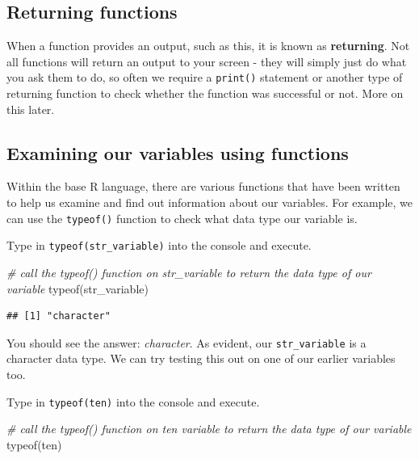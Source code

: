 \documentclass[
]{book}
\newenvironment{Shaded}{\begin{snugshade}}{\end{snugshade}}
\newcommand{\CommentTok}[1]{\textcolor[rgb]{0.56,0.35,0.01}{\textit{#1}}}
\newcommand{\FunctionTok}[1]{\textcolor[rgb]{0.00,0.00,0.00}{#1}}
\newcommand{\NormalTok}[1]{#1}
\begin{document}
\hypertarget{returning-functions}{%
\subsection{Returning functions}\label{returning-functions}}

When a function provides an output, such as this, it is known as \textbf{returning}. Not all functions will return an output to your screen - they will simply just do what you ask them to do, so often we require a \texttt{print()} statement or another type of returning function to check whether the function was successful or not. More on this later.

\hypertarget{examining-our-variables-using-functions}{%
\subsection{Examining our variables using functions}\label{examining-our-variables-using-functions}}

Within the base R language, there are various functions that have been written to help us examine and find out information about our variables. For example, we can use the \texttt{typeof()} function to check what data type our variable is.

Type in \texttt{typeof(str\_variable)} into the console and execute.

\begin{Shaded}
\begin{Highlighting}[]
\CommentTok{\# call the typeof() function on str\_variable to return the data type of our variable}
\FunctionTok{typeof}\NormalTok{(str\_variable)}
\end{Highlighting}
\end{Shaded}

\begin{verbatim}
## [1] "character"
\end{verbatim}

You should see the answer: \emph{character}. As evident, our \texttt{str\_variable} is a character data type. We can try testing this out on one of our earlier variables too.

Type in \texttt{typeof(ten)} into the console and execute.

\begin{Shaded}
\begin{Highlighting}[]
\CommentTok{\# call the typeof() function on ten variable to return the data type of our variable}
\FunctionTok{typeof}\NormalTok{(ten)}
\end{Highlighting}
\end{Shaded}
\end{document}
